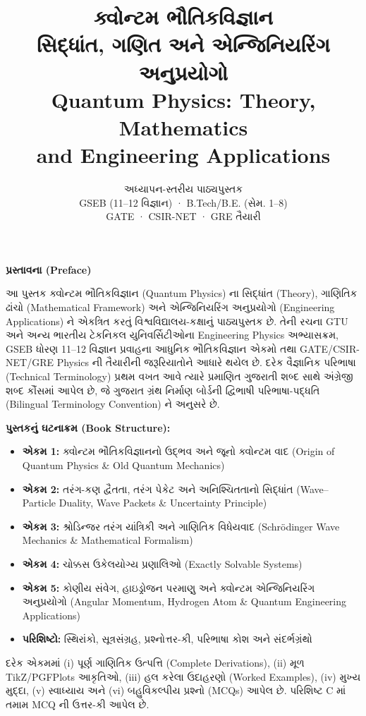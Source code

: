 \documentclass[12pt,a4paper,oneside]{book}
\title{%
  {\Huge\bfseries ક્વોન્ટમ ભૌતિકવિજ્ઞાન}\\[4mm]
  {\Large સિદ્ધાંત, ગણિત અને એન્જિનિયરિંગ અનુપ્રયોગો}\\[8mm]
  {\large Quantum Physics: Theory, Mathematics\\ and Engineering Applications}}
\author{{\normalsize અધ્યાપન-સ્તરીય પાઠ્યપુસ્તક}\\[1mm]
{GSEB (11--12 વિજ્ઞાન) · B.Tech/B.E. (સેમ. 1--8)}\\[0.5mm]
{GATE · CSIR-NET · GRE તૈયારી}}
\date{}
\numberwithin{equation}{chapter}
\begin{document}
\frontmatter
\maketitle

\begin{center}
{\large\bfseries પ્રસ્તાવના (Preface)}\end{center}

આ પુસ્તક ક્વોન્ટમ ભૌતિકવિજ્ઞાન (Quantum Physics) ના સિદ્ધાંત (Theory), ગાણિતિક ઢાંચો (Mathematical Framework)
અને એન્જિનિયરિંગ અનુપ્રયોગો (Engineering Applications) ને એકત્રિત કરતું વિશ્વવિદ્યાલય-કક્ષાનું પાઠ્યપુસ્તક છે.
તેની રચના GTU અને અન્ય ભારતીય ટેકનિકલ યુનિવર્સિટીઓના Engineering Physics અભ્યાસક્રમ, GSEB ધોરણ 11--12 વિજ્ઞાન
પ્રવાહના આધુનિક ભૌતિકવિજ્ઞાન એકમો તથા GATE/CSIR-NET/GRE Physics ની તૈયારીની જરૂરિયાતોને આધારે થયેલ છે.
દરેક વૈજ્ઞાનિક પરિભાષા (Technical Terminology) પ્રથમ વખત આવે ત્યારે પ્રમાણિત ગુજરાતી શબ્દ સાથે અંગ્રેજી શબ્દ
કૌંસમાં આપેલ છે, જે ગુજરાત ગ્રંથ નિર્માણ બોર્ડની દ્વિભાષી પરિભાષા-પદ્ધતિ (Bilingual Terminology Convention) ને
અનુસરે છે.

\textbf{પુસ્તકનું ઘટનાક્રમ (Book Structure):}
\begin{itemize}
  \item \textbf{એકમ 1:} ક્વોન્ટમ ભૌતિકવિજ્ઞાનનો ઉદ્ભવ અને જૂનો ક્વોન્ટમ વાદ (Origin of Quantum Physics \& Old Quantum Mechanics)
  \item \textbf{એકમ 2:} તરંગ-કણ દ્વૈતતા, તરંગ પેકેટ અને અનિશ્ચિતતાનો સિદ્ધાંત (Wave--Particle Duality, Wave Packets \& Uncertainty Principle)
  \item \textbf{એકમ 3:} શ્રોડિન્જર તરંગ યાંત્રિકી અને ગાણિતિક વિધેયવાદ (Schr\"odinger Wave Mechanics \& Mathematical Formalism)
  \item \textbf{એકમ 4:} ચોક્કસ ઉકેલયોગ્ય પ્રણાલિઓ (Exactly Solvable Systems)
  \item \textbf{એકમ 5:} કોણીય સંવેગ, હાઇડ્રોજન પરમાણુ અને ક્વોન્ટમ એન્જિનિયરિંગ અનુપ્રયોગો (Angular Momentum, Hydrogen Atom \& Quantum Engineering Applications)
  \item \textbf{પરિશિષ્ટો:} સ્થિરાંકો, સૂત્રસંગ્રહ, પ્રશ્નોત્તર-કી, પરિભાષા કોશ અને સંદર્ભગ્રંથો
\end{itemize}

દરેક એકમમાં (i) પૂર્ણ ગાણિતિક ઉત્પત્તિ (Complete Derivations), (ii) મૂળ TikZ/PGFPlots આકૃતિઓ,
(iii) હલ કરેલા ઉદાહરણો (Worked Examples), (iv) મુખ્ય મુદ્દા, (v) સ્વાધ્યાય અને (vi) બહુવિકલ્પીય પ્રશ્નો (MCQs)
આપેલ છે. પરિશિષ્ટ C માં તમામ MCQ ની ઉત્તર-કી આપેલ છે.

\tableofcontents

\mainmatter







\end{document}

